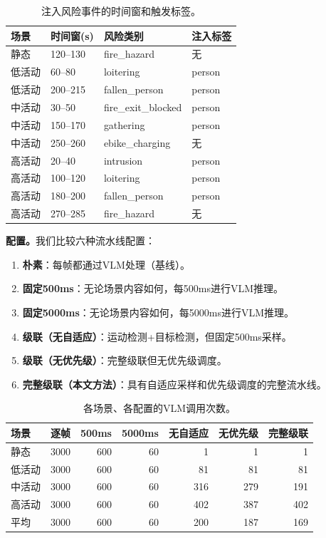 \documentclass[a4paper,10pt]{ctexart}
\begin{document}
\begin{table}[t]
\centering
\caption{注入风险事件的时间窗和触发标签。}
\label{tab:event_windows}
\small
\begin{tabular}{llll}
\toprule
场景 & 时间窗(s) & 风险类别 & 注入标签 \\
\midrule
静态 & 120--130 & fire\_hazard & 无 \\
低活动 & 60--80 & loitering & person \\
低活动 & 200--215 & fallen\_person & person \\
中活动 & 30--50 & fire\_exit\_blocked & person \\
中活动 & 150--170 & gathering & person \\
中活动 & 250--260 & ebike\_charging & 无 \\
高活动 & 20--40 & intrusion & person \\
高活动 & 100--120 & loitering & person \\
高活动 & 180--200 & fallen\_person & person \\
高活动 & 270--285 & fire\_hazard & 无 \\
\bottomrule
\end{tabular}
\end{table}

\textbf{配置。}我们比较六种流水线配置：

\begin{enumerate}
\item \textbf{朴素}：每帧都通过VLM处理（基线）。
\item \textbf{固定500ms}：无论场景内容如何，每500ms进行VLM推理。
\item \textbf{固定5000ms}：无论场景内容如何，每5000ms进行VLM推理。
\item \textbf{级联（无自适应）}：运动检测+目标检测，但固定500ms采样。
\item \textbf{级联（无优先级）}：完整级联但无优先级调度。
\item \textbf{完整级联（本文方法）}：具有自适应采样和优先级调度的完整流水线。
\end{enumerate}

\begin{table}[t]
\centering
\caption{各场景、各配置的VLM调用次数。}
\label{tab:scenario_config_calls}
\small
\begin{tabular}{lrrrrrr}
\toprule
场景 & 逐帧 & 500ms & 5000ms & 无自适应 & 无优先级 & 完整级联 \\
\midrule
静态 & 3000 & 600 & 60 & 1 & 1 & 1 \\
低活动 & 3000 & 600 & 60 & 81 & 81 & 81 \\
中活动 & 3000 & 600 & 60 & 316 & 279 & 191 \\
高活动 & 3000 & 600 & 60 & 402 & 387 & 402 \\
\midrule
平均 & 3000 & 600 & 60 & 200 & 187 & 169 \\
\bottomrule
\end{tabular}
\end{table}
\end{document}

